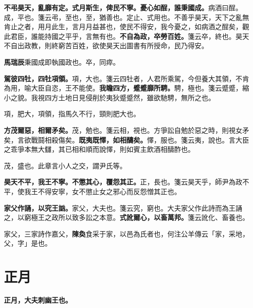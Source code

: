 \textbf{不弔昊天，亂靡有定。式月斯生，俾民不寧。憂心如酲，誰秉國成。}{\footnotesize 病酒曰酲。成，平也。箋云弔，至也，至，猶善也。定止、式用也。不善乎昊天，天下之亂無肯止之者，用月此生，言月月益甚也，使民不得安，我今憂之，如病酒之酲矣，觀此君臣，誰能持國之平乎，言無有也。}\textbf{不自為政，卒勞百姓。}{\footnotesize 箋云卒，終也。昊天不自出政教，則終窮苦百姓，欲使昊天出圖書有所授命，民乃得安。}

\begin{quoting}\textbf{馬瑞辰}秉國成即執國政也。卒，同瘁。\end{quoting}

\textbf{駕彼四牡，四牡項領。}{\footnotesize 項，大也。箋云四牡者，人君所乘駕，今但養大其領，不肯為用，喻大臣自恣，王不能使。}\textbf{我瞻四方，蹙蹙靡所騁。}{\footnotesize 騁，極也。箋云蹙蹙，縮小之貌。我視四方土地日見侵削於夷狄蹙蹙然，雖欲馳騁，無所之也。}

\begin{quoting}項，肥大，項領，指馬久不行，頸則肥大也。\end{quoting}

\textbf{方茂爾惡，相爾矛矣。}{\footnotesize 茂，勉也。箋云相，視也。方爭訟自勉於惡之時，則視女矛矣，言欲戰鬪相殺傷矣。}\textbf{既夷既懌，如相醻矣。}{\footnotesize 懌，服也。箋云夷，說也。言大臣之乖爭本無大讎，其已相和順而說懌，則如賓主飲酒相醻酢也。}

\begin{quoting}茂，盛也。此章言小人之交，謂尹氏等。\end{quoting}

\textbf{昊天不平，我王不寧。不懲其心，覆怨其正。}{\footnotesize 正，長也。箋云昊天乎，師尹為政不平，使我王不得安寧，女不懲止女之邪心而反怨憎其正也。}

\textbf{家父作誦，以究王訩。}{\footnotesize 家父，大夫也。箋云究，窮也。大夫家父作此詩而為王誦之，以窮極王之政所以致多訟之本意。}\textbf{式訛爾心，以畜萬邦。}{\footnotesize 箋云訛化、畜養也。}

\begin{quoting}家父，三家詩作嘉父，\textbf{陳奐}食采于家，以邑為氏者也，何注公羊傳云「家，采地，父，字」是也。\end{quoting}

\section{正月}


\textbf{正月，大夫刺幽王也。}

